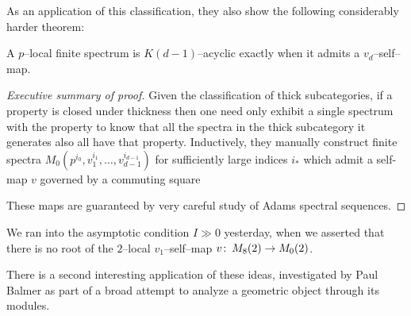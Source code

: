As an application of this classification, they also show the following considerably harder theorem:

\begin{theorem}
A $p$--local finite spectrum is $K(d-1)$--acyclic exactly when it admits a $v_d$--self--map.
\end{theorem}
\begin{proof}[Executive summary of proof]
Given the classification of thick subcategories, if a property is closed under thickness then one need only exhibit a single spectrum with the property to know that all the spectra in the thick subcategory it generates also all have that property.  Inductively, they manually construct finite spectra $M_0(p^{i_0}, v_1^{i_1}, \ldots, v_{d-1}^{i_{d-1}})$ for sufficiently large indices $i_*$ which admit a self-map $v$ governed by a commuting square
\begin{center}
\end{center}
These maps are guaranteed by very careful study of Adams spectral sequences.
\end{proof}

\begin{remark}
We ran into the asymptotic condition $I \gg 0$ yesterday, when we asserted that there is no root of the $2$--local $v_1$--self--map $v\colon\thinspace M_8(2) \to M_0(2)$.
\end{remark}

There is a second interesting application of these ideas, investigated by Paul Balmer as part of a broad attempt to analyze a geometric object through its modules.

